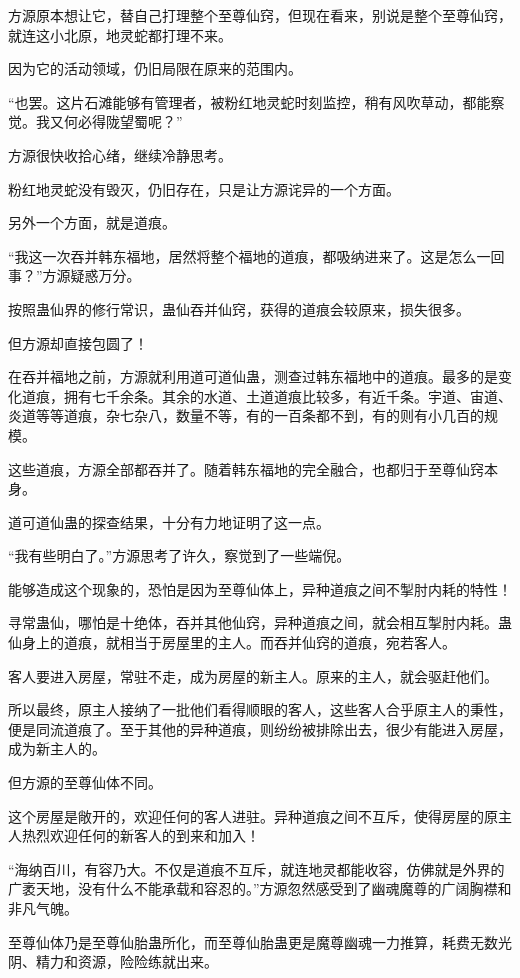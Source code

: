 \begin{this_body}
方源原本想让它，替自己打理整个至尊仙窍，但现在看来，别说是整个至尊仙窍，就连这小北原，地灵蛇都打理不来。

因为它的活动领域，仍旧局限在原来的范围内。

“也罢。这片石滩能够有管理者，被粉红地灵蛇时刻监控，稍有风吹草动，都能察觉。我又何必得陇望蜀呢？”

方源很快收拾心绪，继续冷静思考。

粉红地灵蛇没有毁灭，仍旧存在，只是让方源诧异的一个方面。

另外一个方面，就是道痕。

“我这一次吞并韩东福地，居然将整个福地的道痕，都吸纳进来了。这是怎么一回事？”方源疑惑万分。

按照蛊仙界的修行常识，蛊仙吞并仙窍，获得的道痕会较原来，损失很多。

但方源却直接包圆了！

在吞并福地之前，方源就利用道可道仙蛊，测查过韩东福地中的道痕。最多的是变化道痕，拥有七千余条。其余的水道、土道道痕比较多，有近千条。宇道、宙道、炎道等等道痕，杂七杂八，数量不等，有的一百条都不到，有的则有小几百的规模。

这些道痕，方源全部都吞并了。随着韩东福地的完全融合，也都归于至尊仙窍本身。

道可道仙蛊的探查结果，十分有力地证明了这一点。

“我有些明白了。”方源思考了许久，察觉到了一些端倪。

能够造成这个现象的，恐怕是因为至尊仙体上，异种道痕之间不掣肘内耗的特性！

寻常蛊仙，哪怕是十绝体，吞并其他仙窍，异种道痕之间，就会相互掣肘内耗。蛊仙身上的道痕，就相当于房屋里的主人。而吞并仙窍的道痕，宛若客人。

客人要进入房屋，常驻不走，成为房屋的新主人。原来的主人，就会驱赶他们。

所以最终，原主人接纳了一批他们看得顺眼的客人，这些客人合乎原主人的秉性，便是同流道痕了。至于其他的异种道痕，则纷纷被排除出去，很少有能进入房屋，成为新主人的。

但方源的至尊仙体不同。

这个房屋是敞开的，欢迎任何的客人进驻。异种道痕之间不互斥，使得房屋的原主人热烈欢迎任何的新客人的到来和加入！

“海纳百川，有容乃大。不仅是道痕不互斥，就连地灵都能收容，仿佛就是外界的广袤天地，没有什么不能承载和容忍的。”方源忽然感受到了幽魂魔尊的广阔胸襟和非凡气魄。

至尊仙体乃是至尊仙胎蛊所化，而至尊仙胎蛊更是魔尊幽魂一力推算，耗费无数光阴、精力和资源，险险练就出来。


\end{this_body}
